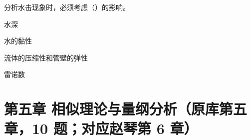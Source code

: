 \begin{ti}
\item[4-20] 分析水击现象时，必须考虑（\quad）的影响。
\begin{choices}
\item 水深
\item 水的黏性
\item 流体的压缩性和管壁的弹性
\item 雷诺数
\end{choices}

\end{ti}

\section*{第五章 相似理论与量纲分析（原库第五章，10 题；对应赵琴第 6 章）}

